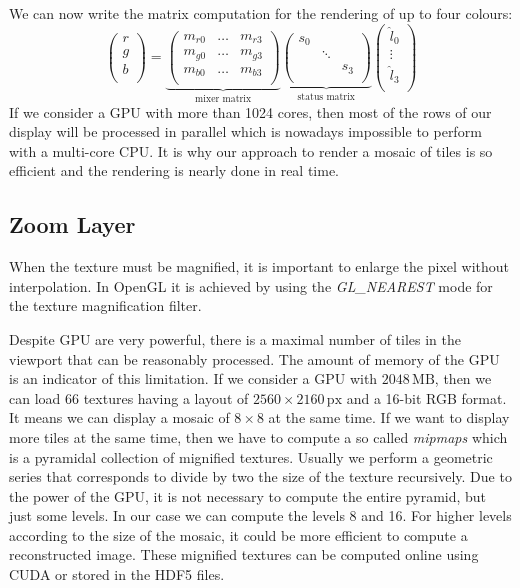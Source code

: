 \documentclass[letterpaper,compsoc,twoside]{IEEEtran}
\begin{document}
We can now write the matrix computation for the rendering of up to four colours:\begin{equation}
\label{texture fragment shader}
\left(\begin{array}{c}
r \\
g \\
b \\
\end{array}\right)
=
\underbrace{
\left(\begin{array}{ccc}
m_{r0} & \ldots & m_{r3} \\
m_{g0} & \ldots & m_{g3} \\
m_{b0} & \ldots & m_{b3} \\
\end{array}\right)
}_\text{mixer matrix}
\underbrace{
\left(\begin{array}{ccc}
s_0 & & \\
& \ddots & \\
& & s_3 \\
\end{array}\right)
}_\text{status matrix}
\left(\begin{array}{c}
\hat{l}_0 \\
\vdots \\
\hat{l}_3 \\
\end{array}\right)
\end{equation}If we consider a GPU with more than 1024 cores, then most of the rows of our display will be
processed in parallel which is nowadays impossible to perform with a multi-core CPU. It is why our
approach to render a mosaic of tiles is so efficient and the rendering is nearly done in real time.

\subsection{Zoom Layer\label{zoom-layer}}


When the texture must be magnified, it is important to enlarge the pixel without interpolation. In
OpenGL it is achieved by using the \emph{GL\_NEAREST} mode for the texture magnification filter.

Despite GPU are very powerful, there is a maximal number of tiles in the viewport that can be
reasonably processed. The amount of memory of the GPU is an indicator of this limitation. If we
consider a GPU with $2048\,\text{MB}$, then we can load 66 textures having a layout of $2560
\times 2160\,\text{px}$ and a 16-bit RGB format. It means we can display a mosaic of $8 \times
8$ at the same time. If we want to display more tiles at the same time, then we have to compute a so
called \emph{mipmaps} which is a pyramidal collection of mignified textures. Usually we perform a
geometric series that corresponds to divide by two the size of the texture recursively. Due to the
power of the GPU, it is not necessary to compute the entire pyramid, but just some levels. In our
case we can compute the levels 8 and 16. For higher levels according to the size of the mosaic, it
could be more efficient to compute a reconstructed image. These mignified textures can be computed
online using CUDA or stored in the HDF5 files.
\end{document}

